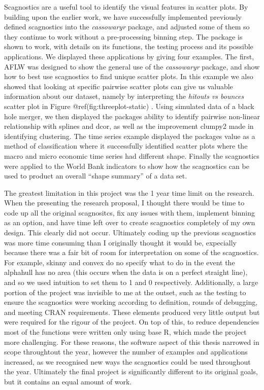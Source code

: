 Scagnostics are a useful tool to identify the visual features in scatter
plots. By building upon the earlier work, we have successfully
implemented previously defined scagnostics into the \emph{cassowaryr}
package, and adjusted some of them so they continue to work without a
pre-processing binning step. The package is shown to work, with details
on its functions, the testing process and its possible applications. We
displayed these applications by giving four examples. The first, AFLW
was designed to show the general use of the \emph{cassowaryr} package,
and show how to best use scagnostics to find unique scatter plots. In
this example we also showed that looking at specific pairwise scatter
plots can give us valuable information about our dataset, namely by
interpreting the \emph{hitouts vs bounces} scatter plot in Figure
@ref(fig:threeplot-static) . Using simulated data of a black hole
merger, we then displayed the packages ability to identify pairwise
non-linear relationship with splines and dcor, as well as the
improvement clumpy2 made in identifying clustering. The time series
example displayed the packages value as a method of classification where
it successfully identified scatter plots where the macro and micro
economic time series had different shape. Finally the scagnostics were
applied to the World Bank indicators to show how the scagnostics can be
used to product an overall ``shape summary'' of a data set.

The greatest limitation in this project was the 1 year time limit on the
research. When the presenting the research proposal, I thought there
would be time to code up all the original scagnositcs, fix any issues
with them, implement binning as an option, and have time left over to
create scagnostics completely of my own design. This clearly did not
occur. Ultimately coding up the previous scagnostics was more time
consuming than I originally thought it would be, expecially because
there was a fair bit of room for interpretation on some of the
scagnostics. For example, skinny and convex do no specify what to do in
the event the alphahull has no area (this occurs when the data is on a
perfect straight line), and so we used intuition to set them to 1 and 0
respectively. Additionally, a large portion of the project was invisible
to me at the outset, such as the testing to ensure the scagnostics were
working according to definition, rounds of debugging, and meeting CRAN
requirements. These elements produced very little output but were
required for the rigour of the project. On top of this, to reduce
dependencies most of the functions were written only using base R, which
made the project more challenging. For these reasons, the software
aspect of this thesis narrowed in scope throughtout the year, however
the number of examples and applications increased, as we recognised new
ways the scagnostics could be used throughout the year. Ultimately the
final project is significantly different to its original goals, but it
contains an equal amount of work.

